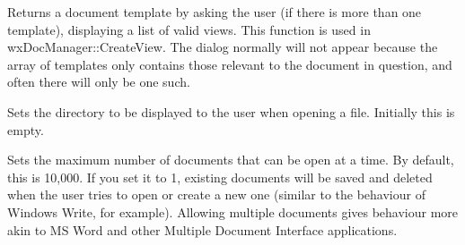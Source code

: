 Returns a document template by asking the user (if there is more than one template),
displaying a list of valid views. This function is used in wxDocManager::CreateView.
The dialog normally will not appear because the array of templates only contains
those relevant to the document in question, and often there will only be one such.





\label{wxdocmanagersetlastdirectory}


Sets the directory to be displayed to the user when opening a file. Initially this is empty.


\label{wxdocmanagersetmaxdocsopen}


Sets the maximum number of documents that can be open at a time. By default, this
is 10,000. If you set it to 1, existing documents will be saved and deleted
when the user tries to open or create a new one (similar to the behaviour
of Windows Write, for example). Allowing multiple documents gives behaviour
more akin to MS Word and other Multiple Document Interface applications.

